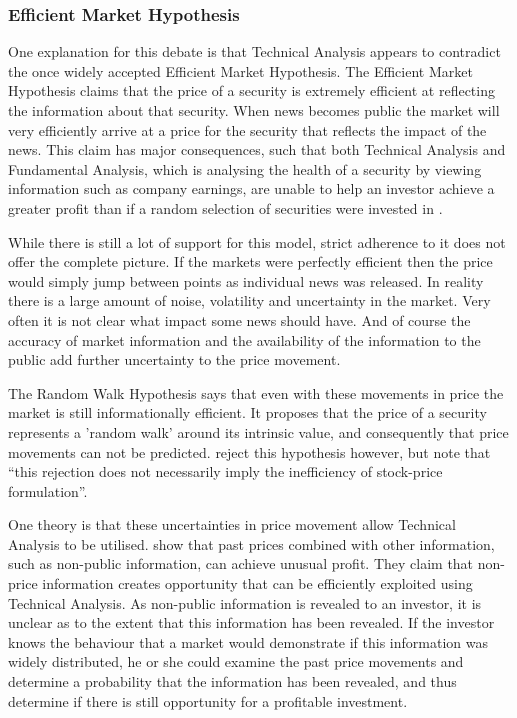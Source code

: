 \documentclass{article}
\begin{document}
\subsubsection{Efficient Market Hypothesis}

One explanation for this debate is that Technical Analysis appears to contradict the once widely accepted Efficient Market Hypothesis. The Efficient Market Hypothesis claims that the price of a security is extremely efficient at reflecting the information about that security. When news becomes public the market will very efficiently arrive at a price for the security that reflects the impact of the news. This claim has major consequences, such that both Technical Analysis and Fundamental Analysis, which is analysing the health of a security by viewing information such as company earnings, are unable to help an investor achieve a greater profit than if a random selection of securities were invested in \citep{emhAndCritics}. 

While there is still a lot of support for this model, strict adherence to it does not offer the complete picture. If the markets were perfectly efficient then the price would simply jump between points as individual news was released. In reality there is a large amount of noise, volatility and uncertainty in the market. Very often it is not clear what impact some news should have. And of course the accuracy of market information and the availability of the information to the public add further uncertainty to the price movement.

The Random Walk Hypothesis says that even with these movements in price the market is still informationally efficient. It proposes that the price of a security represents a 'random walk' around its intrinsic value, and consequently that price movements can not be predicted. \cite{lo1988} reject this hypothesis however, but note that ``this rejection does not necessarily imply the inefficiency of stock-price formulation''.

One theory is that these uncertainties in price movement allow Technical Analysis to be utilised. \cite{indefenseof} show that past prices combined with other information, such as non-public information, can achieve unusual profit. They claim that non-price information creates opportunity that can be efficiently exploited using Technical Analysis. As non-public information is revealed to an investor, it is unclear as to the extent that this information has been revealed. If the investor knows the behaviour that a market would demonstrate if this information was widely distributed, he or she could examine the past price movements and determine a probability that the information has been revealed, and thus determine if there is still opportunity for a profitable investment.
\end{document}
